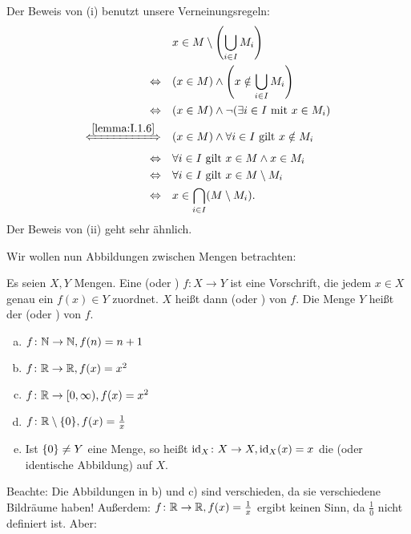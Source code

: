 \begin{beweis}
	Der Beweis von (i) benutzt unsere Verneinungsregeln:
	\begin{align*}
			&x \in M \setminus \enb{\bigcup\limits_{i \in I} M_i} \\
		\Leftrightarrow \quad &(x \in M) \wedge \enb{x \notin \bigcup\limits_{i \in I} M_i} \\
		\Leftrightarrow \quad &(x \in M) \wedge \neg(\exists i \in I \text{ mit } x \in M_i) \\
		\xLeftrightarrow{\ref{lemma:I.1.6}} \quad &(x \in M) \wedge \forall i \in I \text{ gilt } x \notin M_i \\
		\Leftrightarrow \quad &\forall i \in I \text{ gilt } x \in M \wedge x \in M_i \\
		\Leftrightarrow \quad &\forall i \in I \text{ gilt } x \in M \setminus M_i \\
		\Leftrightarrow \quad &x \in \bigcap\limits_{i \in I} (M \setminus M_i).
	\end{align*}
	Der Beweis von (ii) geht sehr ähnlich. \qedhere
\end{beweis}

Wir wollen nun Abbildungen zwischen Mengen betrachten:

\begin{definition}
	\label{def:I.2.9}
	Es seien $X,Y$ Mengen.
	Eine  (oder ) $f\colon X \rightarrow Y$ ist eine Vorschrift, die jedem $x \in X$ genau ein $f(x) \in Y$ zuordnet.
	$X$ heißt dann  (oder ) von $f$.
	Die Menge $Y$ heißt der  (oder ) von $f$.
\end{definition}

\begin{enumerate}[a)]
	\item $f\colon \mathbb{N} \rightarrow \mathbb{N}, f(n) = n+1$
	\item $f \colon \mathbb{R} \rightarrow \mathbb{R}, f(x) = x^2$
	\item $f \colon \mathbb{R} \rightarrow [0,\infty), f(x) = x^2$
	\item $f \colon \mathbb{R} \setminus \{0\}, f(x) = \frac{1}{x}$
	\item Ist $\{0\} \neq Y$ eine Menge, so heißt $\operatorname{id}_X \colon X \rightarrow X, \operatorname{id}_X(x) = x$ die  (oder identische Abbildung) auf $X$.
\end{enumerate}

Beachte: Die Abbildungen in b) und c) sind verschieden, da sie verschiedene Bildräume haben!
Außerdem: $f \colon \mathbb{R} \rightarrow \mathbb{R}, f(x) = \frac{1}{x}$ ergibt keinen Sinn, da $\frac{1}{0}$ nicht definiert ist. Aber:

